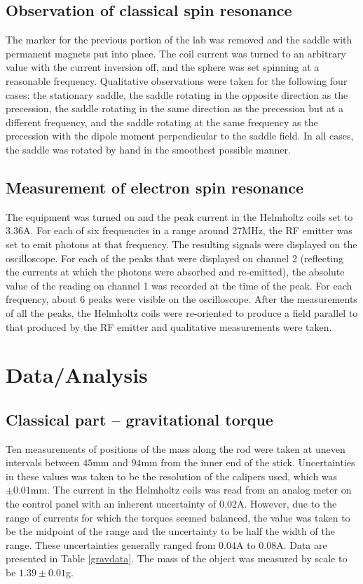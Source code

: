 \documentclass{amsart}
\numberwithin{equation}{section}
\begin{document}
\subsection{Observation of classical spin resonance}
The marker for the previous portion of the lab was removed and the saddle with permanent magnets put into place. The coil current was turned to an arbitrary value with the current inversion off, and the sphere was set spinning at a reasonable frequency. Qualitative observations were taken for the following four cases: the stationary saddle, the saddle rotating in the opposite direction as the precession, the saddle rotating in the same direction as the precession but at a different frequency, and the saddle rotating at the same frequency as the precession with the dipole moment perpendicular to the saddle field. In all cases, the saddle was rotated by hand in the smoothest possible manner.
\subsection{Measurement of electron spin resonance}
The equipment was turned on and the peak current in the Helmholtz coils set to $3.36$A. For each of six frequencies in a range around 27MHz, the RF emitter was set to emit photons at that frequency. The resulting signals were displayed on the oscilloscope. For each of the peaks that were displayed on channel 2 (reflecting the currents at which the photons were absorbed and re-emitted), the absolute value of the reading on channel 1 was recorded at the time of the peak. For each frequency, about 6 peaks were visible on the oscilloscope. After the measurements of all the peaks, the Helmholtz coils were re-oriented to produce a field parallel to that produced by the RF emitter and qualitative measurements were taken.
\section{Data/Analysis}
\subsection{Classical part -- gravitational torque}
Ten measurements of positions of the mass along the rod were taken at uneven intervals between $45$mm and $94$mm from the inner end of the stick. Uncertainties in these values was taken to be the resolution of the calipers used, which was $\pm0.01$mm. The current in the Helmholtz coils was read from an analog meter on the control panel with an inherent uncertainty of $0.02$A. However, due to the range of currents for which the torques seemed balanced, the value was taken to be the midpoint of the range and the uncertainty to be half the width of the range. These uncertainties generally ranged from $0.04$A to $0.08$A. Data are presented in Table \ref{gravdata}. The mass of the object was measured by scale to be $1.39\pm0.01$g. 
\end{document}

